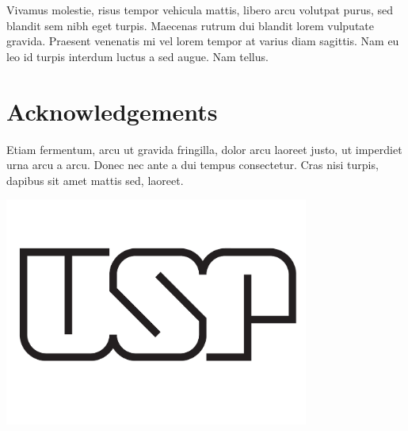 \documentclass[a0,portrait]{a0poster}
\begin{document}
\begin{multicols}{2}
Vivamus molestie, risus tempor vehicula mattis, libero arcu volutpat purus, sed blandit sem nibh eget turpis. Maecenas rutrum dui blandit lorem vulputate gravida. Praesent venenatis mi vel lorem tempor at varius diam sagittis. Nam eu leo id turpis interdum luctus a sed augue. Nam tellus.


\nocite{*} %


\section*{Acknowledgements}

Etiam fermentum, arcu ut gravida fringilla, dolor arcu laoreet justo, ut imperdiet urna arcu a arcu. Donec nec ante a dui tempus consectetur. Cras nisi turpis, dapibus sit amet mattis sed, laoreet.


\end{multicols}


\begin{minipage}[b]{0.3\linewidth}
\includegraphics[width=10cm]{usplogo.pdf}\\
\end{minipage}
\end{document}
